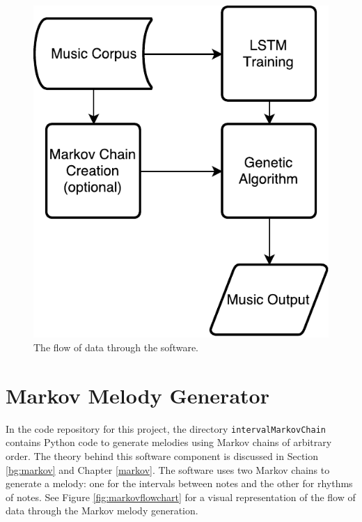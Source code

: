 \begin{figure}[h]
	\centering
	\includegraphics{figures/overview_flowchart.pdf}
	\caption{The flow of data through the software.}
	\label{fig:softwareoverview}
\end{figure}

\section{Markov Melody Generator} \label{software:markov}

In the code repository for this project, the directory \texttt{intervalMarkovChain} contains Python code to generate melodies using Markov chains of arbitrary order.
The theory behind this software component is discussed in Section \ref{bg:markov} and Chapter \ref{markov}.
The software uses two Markov chains to generate a melody: one for the intervals between notes and the other for rhythms of notes.
See Figure \ref{fig:markovflowchart} for a visual representation of the flow of data through the Markov melody generation.

